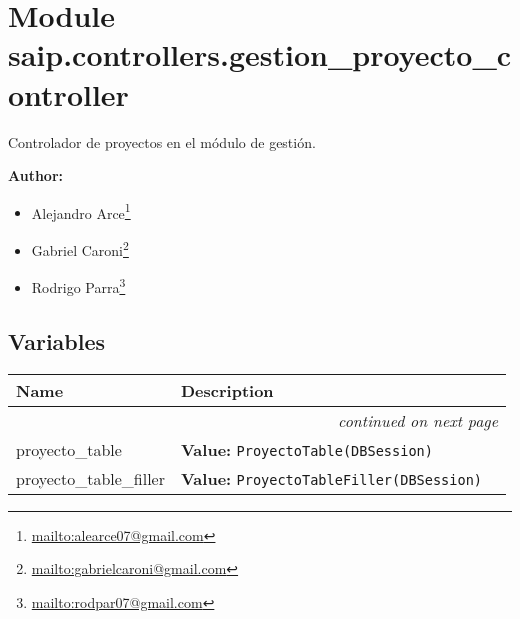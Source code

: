 %
%
%


\section{Module saip.controllers.gestion\_proyecto\_controller}

    \label{saip:controllers:gestion_proyecto_controller}
Controlador de proyectos en el módulo de gestión.

\textbf{Author:} \begin{itemize}
\setlength{\parskip}{0.6ex}
  \item Alejandro 
    Arce\footnote{\href{mailto:alearce07@gmail.com}{mailto:alearce07@gmail.com}}

  \item Gabriel 
    Caroni\footnote{\href{mailto:gabrielcaroni@gmail.com}{mailto:gabrielcaroni@gmail.com}}

  \item Rodrigo 
    Parra\footnote{\href{mailto:rodpar07@gmail.com}{mailto:rodpar07@gmail.com}}

\end{itemize}





  \subsection{Variables}

    \vspace{-1cm}
\hspace{\varindent}\begin{longtable}{|p{\varnamewidth}|p{\vardescrwidth}|l}
\cline{1-2}
\cline{1-2} \centering \textbf{Name} & \centering \textbf{Description}& \\
\cline{1-2}
\endhead\cline{1-2}\multicolumn{3}{r}{\small\textit{continued on next page}}\\\endfoot\cline{1-2}
\endlastfoot\raggedright p\-r\-o\-y\-e\-c\-t\-o\-\_\-t\-a\-b\-l\-e\- & \raggedright \textbf{Value:} 
{\tt ProyectoTable(DBSession)}&\\
\cline{1-2}
\raggedright p\-r\-o\-y\-e\-c\-t\-o\-\_\-t\-a\-b\-l\-e\-\_\-f\-i\-l\-l\-e\-r\- & \raggedright \textbf{Value:} 
{\tt ProyectoTableFiller(DBSession)}&\\
\cline{1-2}
\end{longtable}


